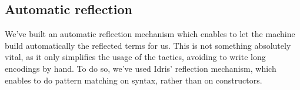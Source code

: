 \subsection{Automatic reflection}
		
We've built an automatic reflection mechanism which enables to let the machine build automatically the reflected terms for us. This is not something absolutely vital, as it only simplifies the usage of the tactics, avoiding to write long encodings by hand. To do so, we've used Idris' reflection mechanism, which enables to do pattern matching on syntax, rather than on constructors. 



